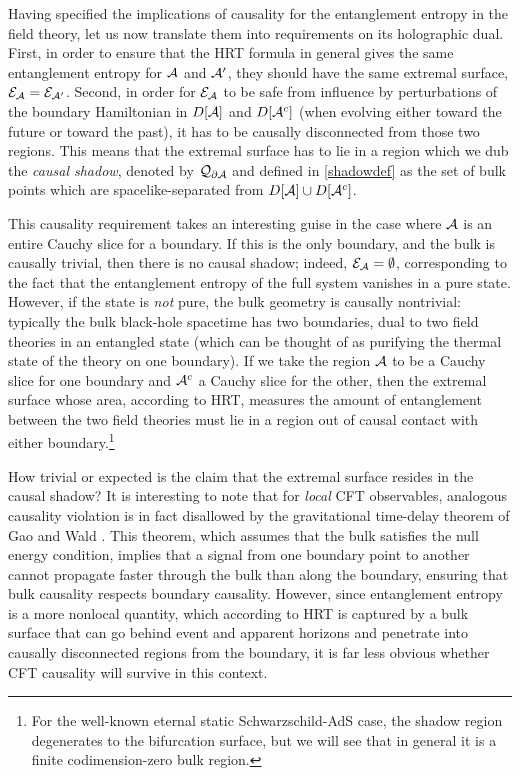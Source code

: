 \documentclass[12pt]{article}
\def\regA{{\cal A}}
\def\regAc{{\cal A}^c}
\def\entsurf{
\partial \regA}
\def\domdA{D[\regA]}
\def\domdAc{D[\regAc]}
\def\extr{{\cal E}_\regA}
\def\shadow{{\cal Q}}
\begin{document}
Having specified the implications of causality for the entanglement entropy in the field theory, let us now translate them into requirements on its holographic dual. First, in order to ensure that the HRT formula in general gives the same entanglement entropy for $\regA$ and $\regA'$, they should have the same extremal surface, $\extr={\cal E}_{\regA'}$. Second, in order for $\extr$ to be safe from influence by perturbations of the boundary Hamiltonian in $\domdA$ and $D[\regA^c]$ (when evolving either toward the future or toward the past), it has to be causally disconnected from those two regions. This means that the extremal surface has to lie in a region which we dub the {\it causal shadow}, denoted by $\shadow_{\entsurf}$ and defined in \eqref{shadowdef} as the set of bulk points which are spacelike-separated from $\domdA\cup\domdAc$.

This causality requirement takes an interesting guise in the case where $\regA$ is an entire Cauchy slice for a boundary.  If this is the only boundary, and the bulk is causally trivial, then there is no causal shadow; indeed, $\extr=\emptyset$, corresponding to the fact that the entanglement entropy of the full system vanishes in a pure state. However, if the state is {\it not} pure, the bulk geometry is causally nontrivial: typically the bulk black-hole spacetime has two boundaries, dual to two field theories in an entangled state (which can be thought of as purifying the thermal state of the theory on one boundary). If we take the region $\regA$ to be a Cauchy slice for one boundary and $\regAc$ a Cauchy slice for the other, then the extremal surface whose area, according to HRT, measures the amount of entanglement between the two field theories must lie in a region out of causal contact with either boundary.\footnote{ For the well-known eternal static Schwarzschild-AdS case, the shadow region degenerates to the bifurcation surface, but we will see that in general it is a finite codimension-zero bulk region.}

How trivial or expected is the claim that the extremal surface resides in the causal shadow? 
It is interesting to note that for {\it local} CFT observables, analogous causality violation is in fact disallowed by the gravitational time-delay theorem of Gao and Wald \cite{Gao:2000ga}. This theorem, which assumes that the bulk satisfies the null energy condition, implies that a signal from one boundary point to another cannot propagate faster through the bulk than along the boundary, ensuring that bulk causality respects boundary causality. However, since entanglement entropy is a more nonlocal quantity, which according to HRT is captured by a bulk surface that can go behind event and apparent horizons \cite{Hubeny:2002dg,AbajoArrastia:2010yt} and penetrate into causally disconnected regions from the boundary, it is far less obvious whether CFT causality will survive in this context.  
\end{document}
